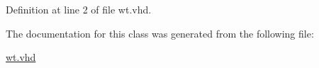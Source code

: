 \subsubsection[{S\+T\+D\+\_\+\+L\+O\+G\+I\+C\+\_\+\+U\+N\+S\+I\+G\+N\+E\+D}]{\hspace{0.3cm}{\ttfamily [Package]}}\label{classwt_a241c3e72dd8024cc8ae831b1b2aed7db}


Definition at line 2 of file wt.\+vhd.



The documentation for this class was generated from the following file\+:\begin{DoxyCompactItemize}
\item 
\hyperlink{wt_8vhd}{wt.\+vhd}\end{DoxyCompactItemize}

